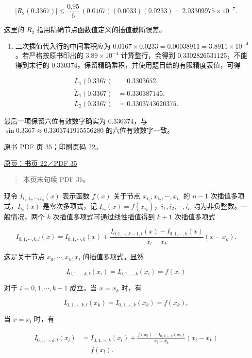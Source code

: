 \[
|R_2(0.3367)|
\le\frac{0.95}{6}\,(0.0167)(0.0033)(0.0233)
=2.03309975\times10^{-7}.
\]

这里的 \(R_2\) 指用精确节点函数值定义的插值截断误差。

\begin{enumerate}
\def\labelenumi{\arabic{enumi}.}
\setcounter{enumi}{3}
\tightlist
\item
  二次插值代入行的中间乘积应为 \(0.0167\times0.0233=0.00038911=3.8911\times10^{-4}\)。若严格按原书印出的 \(3.89\times10^{-4}\) 计算整行，会得到 \(0.3302826531125\)，不能得到末行的 \(0.330374\)。保留精确乘积，并使用题目给的有限精度表值，可得
\end{enumerate}

\[
\begin{aligned}
L_1(0.3367)&=0.3303652,\\
\widetilde L_1(0.3367)&=0.330387145,\\
L_2(0.3367)&=0.3303743620375.
\end{aligned}
\]

最后一项保留六位有效数字确实为 \(0.330374\)，与 \(\sin0.3367\approx0.3303741915556280\) 的六位有效数字一致。

\clearpage

原书 PDF 页 35；印刷页码 22。

\href{source-images/pdf-035.jpeg}{原页：书页 22／PDF 35}

\begin{quote}
本页末句续 PDF 36。
\end{quote}

现令 \(I_{i_1,i_2,\cdots,i_n}(x)\) 表示函数 \(f(x)\) 关于节点 \(x_{i_1},x_{i_2},\cdots,x_{i_n}\) 的 \(n-1\) 次插值多项式，\(I_{i_k}(x)\) 是零次多项式，记 \(I_{i_k}(x)=f(x_{i_k})\)，\(i_1,i_2,\cdots,i_n\) 均为非负整数。一般情况，两个 \(k\) 次插值多项式可通过线性插值得到 \(k+1\) 次插值多项式

\[
I_{0,1,\cdots,k,l}(x)
=I_{0,1,\cdots,k}(x)
+\frac{I_{0,1,\cdots,k-1,l}(x)-I_{0,1,\cdots,k}(x)}
{x_l-x_k}(x-x_k).
\tag{2.3.1}
\]

这是关于节点 \(x_0,\cdots,x_k,x_l\) 的插值多项式。显然

\[
I_{0,1,\cdots,k,l}(x_i)=I_{0,1,\cdots,k}(x_i)=f(x_i)
\]

对于 \(i=0,1,\cdots,k-1\) 成立。当 \(x=x_k\) 时，有

\[
I_{0,1,\cdots,k,l}(x_k)=I_{0,1,\cdots,k}(x_k)=f(x_k),
\]

当 \(x=x_l\) 时，有

\[
\begin{aligned}
I_{0,1,\cdots,k,l}(x_l)
&=I_{0,1,\cdots,k}(x_l)
+\frac{f(x_l)-I_{0,1,\cdots,k}(x_l)}{x_l-x_k}(x_l-x_k)\\
&=f(x_l).
\end{aligned}
\]

